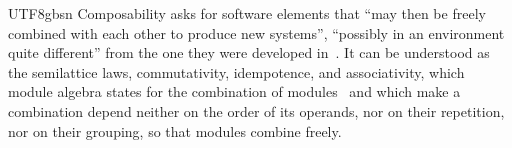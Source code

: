\begin{CJK*}{UTF8}{gbsn}
\else
Composability asks for software elements that ``may then be freely combined with each other to produce
new systems'', ``possibly in an environment quite different'' from the one they were developed
in~\cite[p.~42]{meyer1997-object-oriented-software-construction}.
It can be understood as the semilattice laws, commutativity, idempotence, and associativity, which
module algebra states for the combination of modules~\cite{bergstra1990-module-algebra} and which make a
combination depend neither on the order of its operands, nor on their repetition, nor on their grouping,
so that modules combine freely.
\fi


\end{CJK*}
